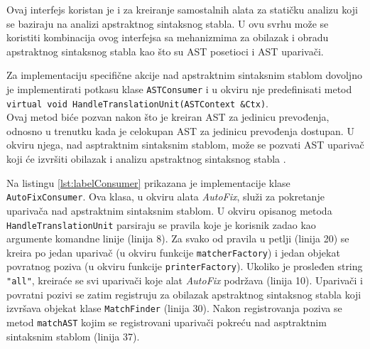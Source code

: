 \documentclass[12pt,oneside]{memoir}
\begin{document}
Ovaj interfejs koristan je i za kreiranje samostalnih alata za stati\v{c}ku analizu koji se baziraju na analizi apstraktnog sintaksnog stabla. U ovu svrhu mo\v{z}e se koristiti kombinacija
ovog interfejsa sa mehanizmima za obilazak i obradu apstraktnog sintaksnog stabla kao \v{s}to su AST posetioci i AST upariva\v{c}i. \par
Za implementaciju specifi\v{c}ne akcije nad apstraktnim sintaksnim stablom
dovoljno je implementirati potkasu klase \texttt{ASTConsumer} i u okviru nje predefinisati metod \\ \texttt{virtual void  HandleTranslationUnit(ASTContext \&Ctx)}.\\
Ovaj metod bi\'{c}e pozvan nakon \v{s}to je kreiran AST za jedinicu prevođenja, odnosno u trenutku kada je celokupan AST za jedinicu prevođenja dostupan.
U okviru njega, nad asptraktnim sintaksnim stablom, mo\v{z}e se pozvati AST upariva\v{c} koji \'{c}e izvr\v{s}iti obilazak i analizu apstraktnog sintaksnog stabla \cite{ASTConsumer}.

\par
Na listingu \ref{lst:labelConsumer} prikazana je implementacije klase \texttt{AutoFixConsumer}. Ova klasa, u okviru alata \textit{AutoFix}, slu\v{z}i za pokretanje 
upariva\v{c}a nad apstraktnim sintaksnim stablom. U okviru opisanog metoda \texttt{HandleTranslationUnit} parsiraju se pravila koje je korisnik zadao kao argumente komandne linije (linija 8). Za svako
od pravila u petlji (linija 20) se kreira po jedan upariva\v{c} (u okviru funkcije \texttt{matcherFactory}) i jedan objekat povratnog poziva (u okviru funkcije \texttt{printerFactory}).
Ukoliko je prosleđen string \texttt{"all"}, kreira\'{c}e se svi upariva\v{c}i koje alat \textit{AutoFix} podr\v{z}ava (linija 10).
Upariva\v{c}i i povratni pozivi se zatim registruju za obilazak apstraktnog sintaksnog stabla koji izvr\v{s}ava objekat klase \texttt{MatchFinder} (linija 30). Nakon registrovanja poziva se metod \texttt{matchAST} kojim se registrovani upariva\v{c}i pokre\'{c}u nad asptraktnim sintaksnim stablom (linija 37).
\end{document}

